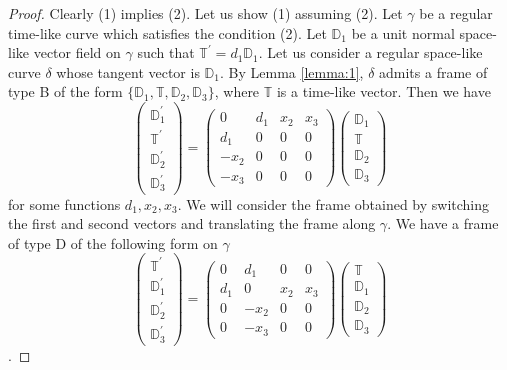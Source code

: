 \documentclass[10pt,a4paper]{amsart}
\newcommand{\DD}{\mathbb{D}}
\newcommand{\TT}{\mathbb{T}}
\begin{document}
\begin{proof}
Clearly (1) implies (2). Let us show (1) assuming (2). Let $\gamma$ be a regular time-like curve which satisfies the condition (2). Let $\DD_{1}$ be a unit normal space-like vector field on $\gamma$ such that $\TT^{\prime}=d_{1}\DD_{1}$. Let us consider a regular space-like curve $\delta$ whose tangent vector is $\DD_{1}$. By Lemma \ref{lemma:1}, $\delta$ admits a frame of type B of the form $\{\DD_{1}, \TT, \DD_{2}, \DD_{3}\}$, where $\TT$ is a time-like vector. Then we have
\[\begin{pmatrix}
\DD_{1}^{\prime}\\
\TT^{\prime}\\
\DD_{2}^{\prime}\\
\DD_{3}^{\prime}
\end{pmatrix}=\begin{pmatrix}
0&d_{1}&x_{2}&x_{3}\\
d_{1}&0&0&0\\
-x_{2}&0&0&0\\
-x_{3}&0&0&0
\end{pmatrix}\begin{pmatrix}
\DD_{1}\\
\TT\\
\DD_{2}\\
\DD_{3}
\end{pmatrix}\]
for some functions $d_{1}, x_{2}, x_{3}$. We will consider the frame obtained by switching the first and second vectors and translating the frame along $\gamma$. We have a frame of type D of the following form on $\gamma$
\[\begin{pmatrix}
\TT^{\prime}\\
\DD_{1}^{\prime}\\
\DD_{2}^{\prime}\\
\DD_{3}^{\prime}
\end{pmatrix}=\begin{pmatrix}
0&d_{1}&0&0\\
d_{1}&0&x_{2}&x_{3}\\
0&-x_{2}&0&0\\
0&-x_{3}&0&0
\end{pmatrix}\begin{pmatrix}
\TT\\
\DD_{1}\\
\DD_{2}\\
\DD_{3}
\end{pmatrix}\].
\end{proof}
\end{document}
